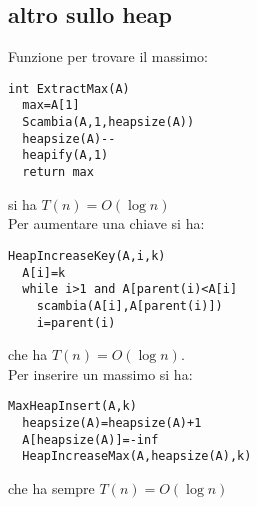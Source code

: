 \documentclass[a4paper,12pt,oneside,tikz]{book}
\begin{document}
\subsection{altro sullo heap}
Funzione per trovare il massimo:
\begin{verbatim}
int ExtractMax(A)
  max=A[1]
  Scambia(A,1,heapsize(A))
  heapsize(A)--
  heapify(A,1)
  return max
\end{verbatim}
si ha $T(n)=O(\log n)$\\
Per aumentare una chiave si ha:
\begin{verbatim}
HeapIncreaseKey(A,i,k)
  A[i]=k
  while i>1 and A[parent(i)<A[i]
    scambia(A[i],A[parent(i)])
    i=parent(i)
\end{verbatim}
che ha $T(n)=O(\log n)$.\\
Per inserire un massimo si ha:
\begin{verbatim}
MaxHeapInsert(A,k)
  heapsize(A)=heapsize(A)+1
  A[heapsize(A)]=-inf
  HeapIncreaseMax(A,heapsize(A),k)
\end{verbatim}
che ha sempre $T(n)=O(\log n)$
\end{document}
